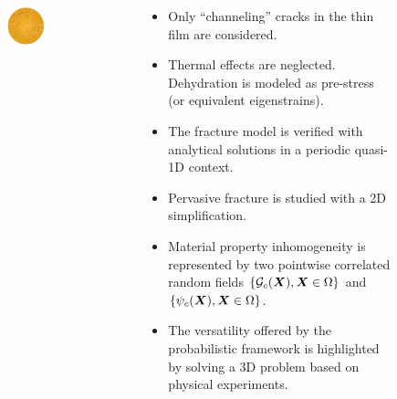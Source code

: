 \begin{frame}
\begin{columns}[T]
\begin{column}{0.6\textwidth}
\begin{figure}
\begin{subfigure}{0.32\textwidth}
          \includegraphics[width=0.8\textwidth]{Chapter345/figures/16mm_top.png}
        \end{subfigure}
      \end{figure}
    \end{column}
    \begin{column}{0.4\textwidth}
      \begin{itemize}
        \item Only ``channeling'' cracks in the thin film are considered.
        \item Thermal effects are neglected. Dehydration is modeled as pre-stress (or equivalent eigenstrains).
        \item The fracture model is verified with analytical solutions in a periodic quasi-1D context.
        \item Pervasive fracture is studied with a 2D simplification.
        \item Material property inhomogeneity is represented by two pointwise correlated random fields $\{{\mathcal{G}_c}(\boldsymbol{X}), \boldsymbol{X} \in \Omega\}$ and $\{\psi_c(\boldsymbol{X}), \boldsymbol{X} \in \Omega\}$.
        \item The versatility offered by the probabilistic framework is highlighted by solving a 3D problem based on physical experiments.
      \end{itemize}
    \end{column}
  \end{columns}
\end{frame}
